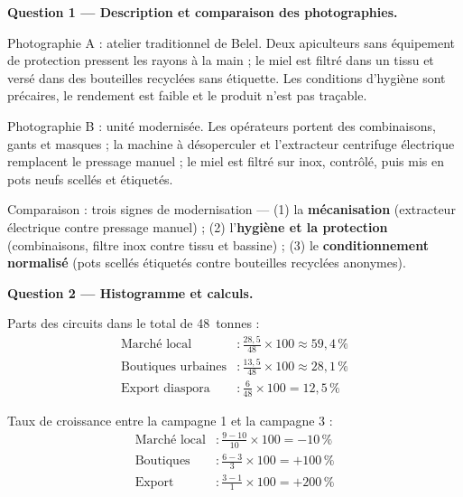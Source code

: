 \documentclass[11pt]{article}
\begin{document}
\begin{exoresolu}
\textbf{Question 1 — Description et comparaison des photographies.}

Photographie A : atelier traditionnel de Belel. Deux apiculteurs sans équipement de protection pressent les rayons à la main ; le miel est filtré dans un tissu et versé dans des bouteilles recyclées sans étiquette. Les conditions d'hygiène sont précaires, le rendement est faible et le produit n'est pas traçable.

Photographie B : unité modernisée. Les opérateurs portent des combinaisons, gants et masques ; la machine à désoperculer et l'extracteur centrifuge électrique remplacent le pressage manuel ; le miel est filtré sur inox, contrôlé, puis mis en pots neufs scellés et étiquetés.

Comparaison : trois signes de modernisation — (1) la \textbf{mécanisation} (extracteur électrique contre pressage manuel) ; (2) l'\textbf{hygiène et la protection} (combinaisons, filtre inox contre tissu et bassine) ; (3) le \textbf{conditionnement normalisé} (pots scellés étiquetés contre bouteilles recyclées anonymes).

\textbf{Question 2 — Histogramme et calculs.}

Parts des circuits dans le total de \SI{48}{tonnes} :
\begin{align*}
\text{Marché local} &: \frac{28{,}5}{48} \times 100 \approx 59{,}4\,\% \\
\text{Boutiques urbaines} &: \frac{13{,}5}{48} \times 100 \approx 28{,}1\,\% \\
\text{Export diaspora} &: \frac{6}{48} \times 100 = 12{,}5\,\%
\end{align*}

Taux de croissance entre la campagne 1 et la campagne 3 :
\begin{align*}
\text{Marché local} &: \frac{9 - 10}{10} \times 100 = -10\,\% \\
\text{Boutiques} &: \frac{6 - 3}{3} \times 100 = +100\,\% \\
\text{Export} &: \frac{3 - 1}{1} \times 100 = +200\,\%
\end{align*}


\end{exoresolu}
\end{document}
